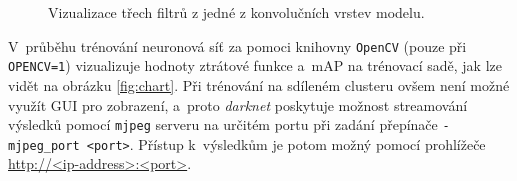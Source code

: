 \begin{figure}[H]
    \centering
    \caption{Vizualizace třech filtrů z jedné z konvolučních vrstev modelu.}
    \label{fig:weightsVis}
\end{figure}

V~průběhu trénování neuronová síť za pomoci knihovny \texttt{OpenCV} (pouze při \texttt{OPENCV=1}) vizualizuje hodnoty ztrátové funkce a~mAP na trénovací sadě, jak lze vidět na obrázku \ref{fig:chart}. Při trénování na sdíleném clusteru ovšem není možné využít GUI pro zobrazení, a~proto \emph{darknet} poskytuje možnost streamování výsledků pomocí \texttt{mjpeg} serveru na určitém portu při zadání přepínače \texttt{-mjpeg\_port <port>}. Přístup k~výsledkům je potom možný pomocí prohlížeče \url{http://<ip-address>:<port>}.

